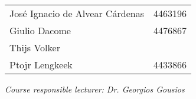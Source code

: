 \begin{titlepage}
\begin{center}
\begin{table}[htb]
\centering
\label{team}
\begin{tabular}{ll}
Jos\'e Ignacio de Alvear C\'ardenas & 4463196 \\
Giulio Dacome   & 4476867 \\
Thijs Volker    &  \\
Ptojr Lengkeek   & 4433866 \\ 

                          
\end{tabular}
\end{table}

\emph{Course responsible lecturer: Dr. Georgios Gousios}

\bigskip
\bigskip

\end{center}

\end{titlepage}